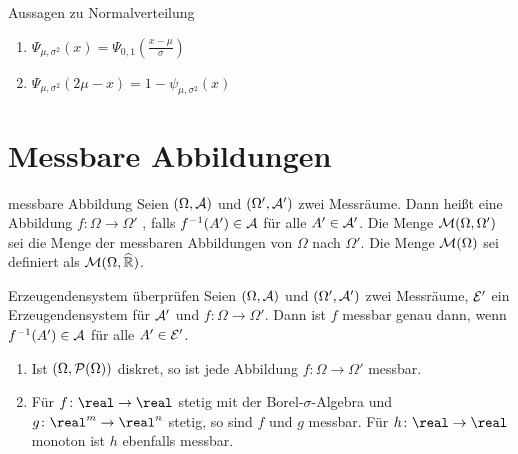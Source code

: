 \begin{Satz}{Aussagen zu Normalverteilung}
    \begin{enumerate}
        \item
        $\Psi_{\mu,\sigma^2}(x) = \Psi_{0,1}\left(\frac{x - \mu}{\sigma}\right)$

        \item
        $\Psi_{\mu,\sigma^2}(2\mu - x) = 1 - \psi_{\mu,\sigma^2}(x)$
    \end{enumerate}
\end{Satz}

\pagebreak

\section{%
    Messbare Abbildungen%
}

\begin{Def}{messbare Abbildung}
    Seien $(\Omega, \A)$ und $(\Omega', \A')$ zwei Messräume.
    Dann heißt eine Abbildung $f\colon \Omega \rightarrow \Omega'$ ,
    falls $f^{-1}(A') \in \A$ für alle $A' \in \A'$.
    Die Menge $\M(\Omega, \Omega')$ sei die Menge der messbaren Abbildungen von $\Omega$ nach
    $\Omega'$.
    Die Menge $\M(\Omega)$ sei definiert als $\M(\Omega, \extreal)$.
\end{Def}

\begin{Satz}{Erzeugendensystem überprüfen}
    Seien $(\Omega, \A)$ und $(\Omega', \A')$ zwei Messräume,
    $\E'$ ein Erzeugendensystem für $\A'$ und $f\colon \Omega \rightarrow \Omega'$.
    Dann ist $f$ messbar genau dann, wenn $f^{-1}(A') \in \A$ für alle $A' \in \E'$.
\end{Satz}

\begin{Bsp}
    \begin{enumerate}
        \item
        Ist $(\Omega, \P(\Omega))$ diskret, so ist jede Abbildung
        $f\colon \Omega \rightarrow \Omega'$ messbar.

        \item
        Für $f\colon \real \rightarrow \real$ stetig mit der Borel-$\sigma$-Algebra und
        $g\colon \real^m \rightarrow \real^n$ stetig, so sind $f$ und $g$ messbar.
        Für $h\colon \real \rightarrow \real$ monoton ist $h$ ebenfalls messbar.
    \end{enumerate}
\end{Bsp}

